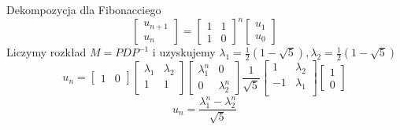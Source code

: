 \documentclass[handout]{beamer}
\theoremstyle{definition}
\theoremstyle{named}
\begin{document}
\begin{frame}{Dekompozycja dla Fibonacciego}
    \begin{equation*}
        \begin{bmatrix}
        u_{n+1} \\
        u_{n}
        \end{bmatrix}
        = 
        \begin{bmatrix}
        1 & 1\\
        1 & 0
        \end{bmatrix}^n
        \begin{bmatrix}
        u_1 \\
        u_0 
        \end{bmatrix}

    \end{equation*}
    Liczymy rozkład $M = PDP^{-1}$ i uzyskujemy $\lambda_1 =  \frac{1}{2} \left(1-\sqrt{5}\right), \lambda_2 = \frac{1}{2} \left(1-\sqrt{5}\right) $
\begin{equation*}
    u_n = 
        \begin{bmatrix}
           1 & 0
        \end{bmatrix}
        \begin{bmatrix}
            \lambda_1 & \lambda_2 \\
         1 & 1 \\
        \end{bmatrix}
        \begin{bmatrix}
           \lambda_1^{n} & 0 \\
            0 & \lambda_2^{n}
        \end{bmatrix}
        \frac{1}{\sqrt{5}}
        \begin{bmatrix}
           1 & \lambda_2 \\
           -1  & \lambda_1 \\
        \end{bmatrix} 
        \begin{bmatrix}
           1 \\
           0
        \end{bmatrix}
    \end{equation*}
    \begin{equation*}
        u_n = \frac{\lambda_1^{n} - \lambda_2^{n}}{\sqrt{5}}
    \end{equation*}
 
 
\end{frame}
\end{document}
